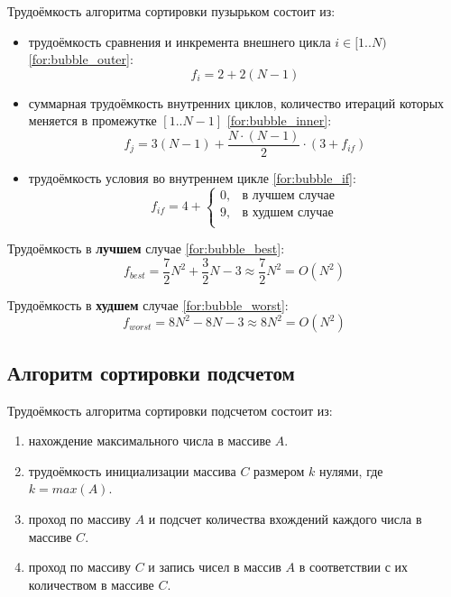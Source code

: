 Трудоёмкость алгоритма сортировки пузырьком состоит из:
\begin{itemize}
    \item трудоёмкость сравнения и инкремента внешнего цикла $i \in [1..N)$ \eqref{for:bubble_outer}:
    \begin{equation}
        \label{for:bubble_outer}
        f_{i} = 2 + 2(N - 1)
    \end{equation}
    \item суммарная трудоёмкость внутренних циклов, количество итераций которых меняется в промежутке $[1..N-1]$ \eqref{for:bubble_inner}:
    \begin{equation}
        \label{for:bubble_inner}
        f_{j} = 3(N - 1) + \frac{N \cdot (N - 1)}{2} \cdot (3 + f_{if})
    \end{equation}
    \item трудоёмкость условия во внутреннем цикле \eqref{for:bubble_if}:
    \begin{equation}
        \label{for:bubble_if}
        f_{if} = 4 + \begin{cases}
                         0, & \text{в лучшем случае}\\
                         9, & \text{в худшем случае}\\
        \end{cases}
    \end{equation}
\end{itemize}

Трудоёмкость в \textbf{лучшем} случае \eqref{for:bubble_best}:
\begin{equation}
    \label{for:bubble_best}
    f_{best} = \frac{7}{2} N^2 + \frac{3}{2} N - 3 \approx \frac{7}{2} N^2 = O(N^2)
\end{equation}

Трудоёмкость в \textbf{худшем} случае \eqref{for:bubble_worst}:
\begin{equation}
    \label{for:bubble_worst}
    f_{worst} =  8N^2 - 8N - 3 \approx 8N^2 = O(N^2)
\end{equation}

\subsection{Алгоритм сортировки подсчетом}

Трудоёмкость алгоритма сортировки подсчетом состоит из:
\begin{enumerate}
    \item нахождение максимального числа в массиве $A$.
    \item трудоёмкость инициализации массива $C$ размером $k$ нулями, где $k = max(A)$.
    \item проход по массиву $A$ и подсчет количества вхождений каждого числа в массиве $C$.
    \item проход по массиву $C$ и запись чисел в массив $A$ в соответствии с их количеством в массиве $C$.
\end{enumerate}

